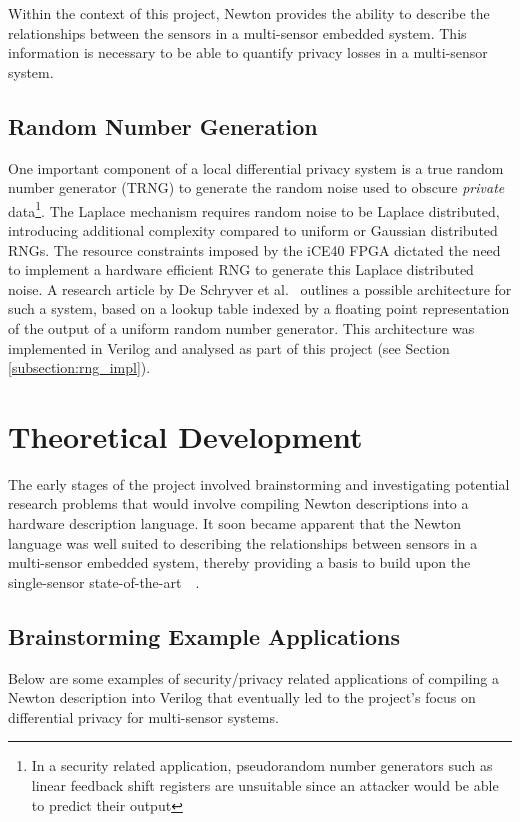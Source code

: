 \documentclass[12pt]{article}
\begin{document}
    Within the context of this project, Newton provides the ability to describe the relationships between the sensors in a multi-sensor embedded system. This information is necessary to be able to quantify privacy losses in a multi-sensor system.

  \subsection{Random Number Generation} \label{subsection:intro_rng}
    One important component of a local differential privacy system is a true random number generator (TRNG) to generate the random noise used to obscure \textit{private} data\footnote{In a security related application, pseudorandom number generators such as linear feedback shift registers are unsuitable since an attacker would be able to predict their output}. The Laplace mechanism requires random noise to be Laplace distributed, introducing additional complexity compared to uniform or Gaussian distributed RNGs. The resource constraints imposed by the iCE40 FPGA dictated the need to implement a hardware efficient RNG to generate this Laplace distributed noise. A research article by De Schryver et al.~\cite{DeSchryver} outlines a possible architecture for such a system, based on a lookup table indexed by a floating point representation of the output of a uniform random number generator. This architecture was implemented in Verilog and analysed as part of this project (see Section \ref{subsection:rng_impl}).


\newpage



%
%

\section{Theoretical Development}
  The early stages of the project involved brainstorming and investigating potential research problems that would involve compiling Newton descriptions into a hardware description language. It soon became apparent that the Newton language was well suited to describing the relationships between sensors in a multi-sensor embedded system, thereby providing a basis to build upon the single-sensor state-of-the-art~\cite{Choi2018GuaranteeingLD}~\cite{diffpriv_2006}.
  \subsection{Brainstorming Example Applications}
    Below are some examples of security/privacy related applications of compiling a Newton description into Verilog that eventually led to the project's focus on differential privacy for multi-sensor systems.
\end{document}
